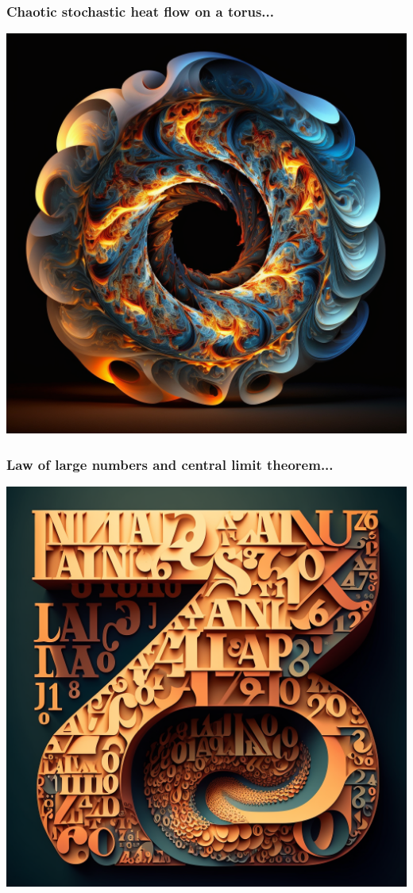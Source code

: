 \documentclass[9pt,table,xcolor=dvipsnames]{beamer}%
\theoremstyle{definition}
\theoremstyle{plain}
\begin{document}
\begin{frame}[fragile,t] %
  \frametitle{Chaotic stochastic heat flow on a torus...}
  \begin{center}
    \includegraphics[scale=0.22]{./figs/chenle02_Chaotic_stochastic_heat_flow_on_a_torus.png}
  \end{center}
\end{frame}
\begin{frame}[fragile,t] %
  \frametitle{Law of large numbers and central limit theorem...}
  \begin{center}
    \includegraphics[scale=0.22]{./figs/chenle02_Law_of_large_numbers_and_central_limit_theorem.png}
  \end{center}
\end{frame}
\end{document}
